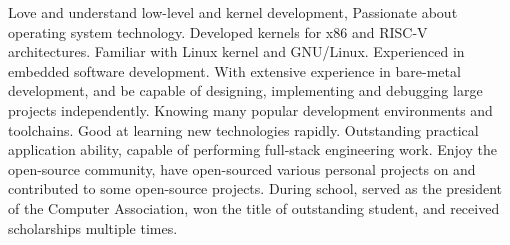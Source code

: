 \documentclass[en]{resume}
\begin{document}
\makeheader

{\onehalfspacing
\hspace{2em}
Love and understand low-level and kernel development, Passionate about operating system technology.
Developed kernels for x86 and RISC-V architectures. Familiar with Linux kernel and GNU/Linux. Experienced in embedded software development.
With extensive experience in bare-metal development, and be capable of designing, implementing and debugging large projects independently. Knowing many popular development environments and toolchains. Good at learning new technologies rapidly.
Outstanding practical application ability, capable of performing full-stack engineering work.
Enjoy the open-source community, have open-sourced various personal projects on  and contributed to some open-source projects. 
During school, served as the president of the Computer Association, won the title of outstanding student, and received scholarships multiple times.
\par}


\begin{competences}[11em]
\end{competences}

\end{document}
